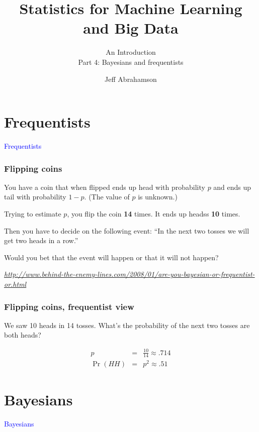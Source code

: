 \documentclass[t]{beamer}
\title
{Statistics for Machine Learning and Big Data}
\subtitle{An Introduction\\[6mm] Part 4: Bayesians and frequentists}
\author[Abrahamson] {Jeff Abrahamson}
\newcommand\blue[1]{\textcolor{blue}{#1}}
\newcommand\smallgray[1]{\textcolor{gray}{\small\it #1}}
\newcommand\prevwork[1]{\smallgray{#1}}
\newcommand\talksection[1]{\section{#1}
\begin{frame}
  \vfill\Huge\bf\blue{\centerline{#1}}
\end{frame}
}
\begin{document}
\begin{frame}
  \titlepage
\end{frame}

\talksection{Frequentists}

\begin{frame}
  \frametitle{Flipping coins}

  You have a coin that when flipped ends up head with probability $p$
  and ends up tail with probability $1-p$. (The value of $p$ is
  unknown.)

  Trying to estimate $p$, you flip the coin \textbf{14} times. It ends
  up headss \textbf{10} times.

  Then you have to decide on the following event: ``In the next two
  tosses we will get two heads in a row.''

  Would you bet that the event will happen or that it will not happen?

  \vfill
  \prevwork{\url{http://www.behind-the-enemy-lines.com/2008/01/are-you-bayesian-or-frequentist-or.html}}

  \note{

  }
\end{frame}

\begin{frame}
  \frametitle{Flipping coins, frequentist view}

  We saw 10 heads in 14 tosses.  What's the probability of the next two tosses are both heads?

  \begin{eqnarray*}
    p & = & \frac{10}{14} \approx .714\\[5mm]
    \Pr(HH) & = & p^2 \approx .51
  \end{eqnarray*}

\end{frame}

\talksection{Bayesians}
\end{document}
